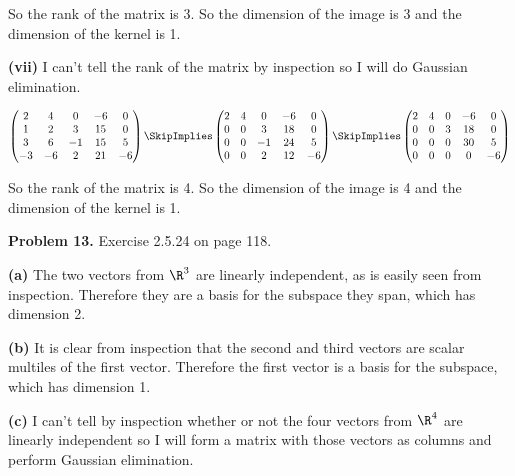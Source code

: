 \documentclass[oneside,12pt]{amsart}
\begin{document}
\bigskip

So the rank of the matrix is 3. So the dimension of the image is 3 and the
dimension of the kernel is 1.

\bigskip

\textbf{(vii)} I can't tell the rank of the matrix by inspection so I will do
Gaussian elimination.

\bigskip

$
\begin{pmatrix}
2 & 4 & 0 & -6 & 0 \\
1 & 2 & 3 & 15 & 0 \\
3 & 6 & -1 & 15 & 5 \\
-3 & -6 & 2 & 21 & -6
\end{pmatrix}
\SkipImplies
\begin{pmatrix}
2 & 4 & 0 & -6 & 0 \\
0 & 0 & 3 & 18 & 0 \\
0 & 0 & -1 & 24 & 5 \\
0 & 0 & 2 & 12 & -6
\end{pmatrix}
\SkipImplies
\begin{pmatrix}
2 & 4 & 0 & -6 & 0 \\
0 & 0 & 3 & 18 & 0 \\
0 & 0 & 0 & 30 & 5 \\
0 & 0 & 0 & 0 & -6
\end{pmatrix}
$

\bigskip

So the rank of the matrix is 4. So the dimension of the image is 4 and the
dimension of the kernel is 1.


\bigskip

\textbf{Problem 13.} Exercise 2.5.24 on page 118.

\bigskip

\textbf{(a)} The two vectors from $\R^3$ are linearly independent, as is
easily seen from inspection. Therefore they are a basis for the subspace
they span, which has dimension 2.

\bigskip

\textbf{(b)} It is clear from inspection that the second and third vectors
are scalar multiles of the first vector. Therefore the first vector is a basis
for the subspace, which has dimension 1.

\bigskip

\textbf{(c)} I can't tell by inspection whether or not the four vectors from
$\R^4$ are linearly independent so I will form a matrix with those vectors
as columns and perform Gaussian elimination.
\end{document}

